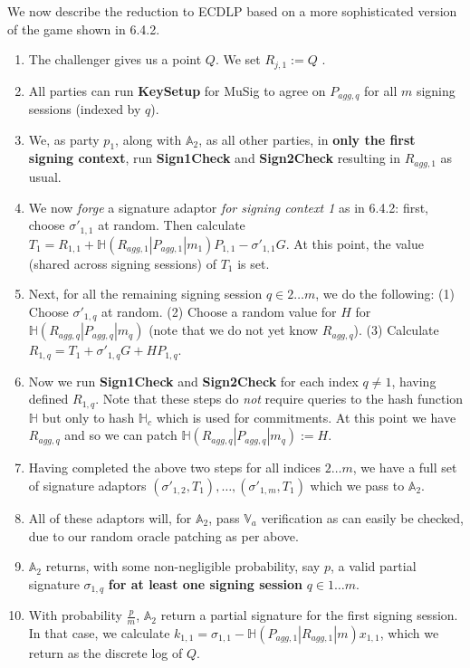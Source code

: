 \documentclass[10pt,a4paper]{article}
\begin{document}
We now describe the reduction to ECDLP based on a more sophisticated version of the game shown in 6.4.2.

\vspace{5 pt}

\begin{enumerate}
\item The challenger gives us a point $Q$. We set $R_{j,1} := Q$ .
\item All parties can run \textbf{KeySetup} for MuSig to agree on $P_{agg,q}$ for all $m$ signing sessions (indexed by $q$).
\item We, as party $p_1$, along with $\mathbb{A}_2$, as all other parties, in \textbf{only the first signing context}, run \textbf{Sign1Check} and \textbf{Sign2Check} resulting in  $R_{agg,1}$ as usual.
\item We now \emph{forge} a signature adaptor \emph{for signing context 1} as in 6.4.2: first, choose $\sigma'_{1,1}$ at random. Then calculate $T_1 = R_{1,1} + \mathbb{H}(R_{agg,1}|P_{agg,1}|m_1)P_{1,1} - \sigma'_{1,1} G$. At this point, the value (shared across signing sessions) of $T_1$ is set.
\item Next, for all the remaining signing session $q \in 2 \ldots m$, we do the following: (1) Choose $\sigma'_{1,q}$ at random. (2) Choose a random value for $H$ for $\mathbb{H}(R_{agg,q}|P_{agg,q}|m_q)$ (note that we do not yet know $R_{agg,q}$). (3) Calculate $R_{1,q} = T_1 + \sigma'_{1,q}G + HP_{1,q}$.
\item Now we run \textbf{Sign1Check} and \textbf{Sign2Check} for each index $q \ne 1$, having defined $R_{1, q}$. Note that these steps do \emph{not} require queries to the hash function $\mathbb{H}$ but only to hash $\mathbb{H}_c$ which is used for commitments. At this point we have $R_{agg,q}$ and so we can patch $\mathbb{H}(R_{agg,q}|P_{agg,q}|m_q) := H$.
\item Having completed the above two steps for all indices $2 \ldots m$, we have a full set of signature adaptors $(\sigma'_{1,2}, T_1), \ldots , (\sigma'_{1,m}, T_1)$ which we pass to $\mathbb{A}_2$.
\item All of these adaptors will, for $\mathbb{A}_2$, pass $\mathbb{V}_a$ verification as can easily be checked, due to our random oracle patching as per above.
\item $\mathbb{A}_2$ returns, with some non-negligible probability, say $p$, a valid partial signature $\sigma_{1, q}$ \textbf{for at least one signing session} $q \in 1 \ldots m$.
\item With probability $\frac{p}{m}$, $\mathbb{A}_2$ return a partial signature for the first signing session. In that case, we calculate $k_{1,1} = \sigma_{1,1} - \mathbb{H}(P_{agg,1}|R_{agg,1}|m)x_{1,1}$, which we return as the discrete log of $Q$.
\end{enumerate}
\end{document}
